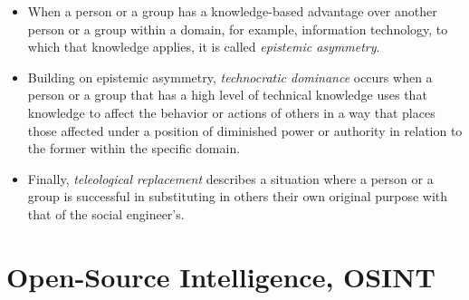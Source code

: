 \begin{itemize}

    \item When a person or a group has a knowledge-based advantage over another person or a group within a domain, for example, information technology, to which that knowledge applies, it is called \textit{epistemic asymmetry}.

    \item Building on epistemic asymmetry, \textit{technocratic dominance} occurs when a person or a group that has a high level of technical knowledge uses that knowledge to affect the behavior or actions of others in a way that places those affected under a position of diminished power or authority in relation to the former within the specific domain.

    \item Finally, \textit{teleological replacement} describes a situation where a person or a group is successful in substituting in others their own original purpose with that of the social engineer's.
    
\end{itemize}







\section{Open-Source Intelligence, OSINT}
\begin{comment}

    - OSINT, sometimes written as OS-INT?
    - Data from publicly available resources
        - Company website
        - Social networking sites
        - Sites like archive.org and Google archives
        - Observing people in real life
    - Does not include calling the company and asking for information or any other forms of engagement
    - How modern AI augments OSINT gathering is analyzed in the last chapter
        - Exploration of how AI tools and techniques used for the automation and enhancement of OSINT processes
    - Stress the importance of OSINT within SE
    - Ethical considerations when it comes to OSINT
    - Some case studies highlighting the use of OSINT in real-world social engineering incidents?
    - Countermeasures will also be covered later
        - Strategies for companies to mitigate the risks associated with OSINT-based attacks
        - Integration of AI algorithms for analyzing and extracting valuable insights from OSINT data
        - Impact of AI-powered intelligence gathering of SE attacks
        
\end{comment}

